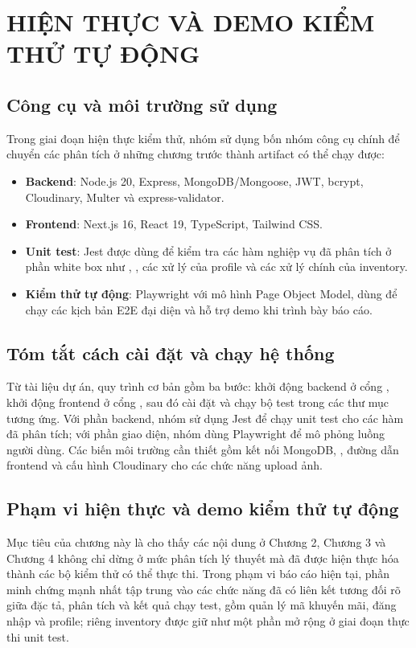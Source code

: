 \newpage
\section{\textbf{HIỆN THỰC VÀ DEMO KIỂM THỬ TỰ ĐỘNG}}

\subsection{Công cụ và môi trường sử dụng}
Trong giai đoạn hiện thực kiểm thử, nhóm sử dụng bốn nhóm công cụ chính để chuyển các phân tích ở những chương trước thành artifact có thể chạy được:
\begin{itemize}
	\item \textbf{Backend}: Node.js 20, Express, MongoDB/Mongoose, JWT, bcrypt, Cloudinary, Multer và express-validator.
	\item \textbf{Frontend}: Next.js 16, React 19, TypeScript, Tailwind CSS.
	\item \textbf{Unit test}: Jest được dùng để kiểm tra các hàm nghiệp vụ đã phân tích ở phần white box như , , các xử lý của profile và các xử lý chính của inventory.
	\item \textbf{Kiểm thử tự động}: Playwright với mô hình Page Object Model, dùng để chạy các kịch bản E2E đại diện và hỗ trợ demo khi trình bày báo cáo.
\end{itemize}

\subsection{Tóm tắt cách cài đặt và chạy hệ thống}
Từ tài liệu dự án, quy trình cơ bản gồm ba bước: khởi động backend ở cổng , khởi động frontend ở cổng , sau đó cài đặt và chạy bộ test trong các thư mục tương ứng. Với phần backend, nhóm sử dụng Jest để chạy unit test cho các hàm đã phân tích; với phần giao diện, nhóm dùng Playwright để mô phỏng luồng người dùng. Các biến môi trường cần thiết gồm kết nối MongoDB, , đường dẫn frontend và cấu hình Cloudinary cho các chức năng upload ảnh.

\subsection{Phạm vi hiện thực và demo kiểm thử tự động}
Mục tiêu của chương này là cho thấy các nội dung ở Chương 2, Chương 3 và Chương 4 không chỉ dừng ở mức phân tích lý thuyết mà đã được hiện thực hóa thành các bộ kiểm thử có thể thực thi. Trong phạm vi báo cáo hiện tại, phần minh chứng mạnh nhất tập trung vào các chức năng đã có liên kết tương đối rõ giữa đặc tả, phân tích và kết quả chạy test, gồm quản lý mã khuyến mãi, đăng nhập và profile; riêng inventory được giữ như một phần mở rộng ở giai đoạn thực thi unit test.

